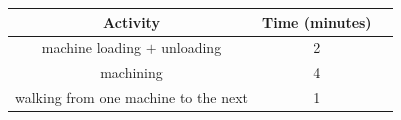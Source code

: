 \begin{center}
\begin{tabular}[12pt]{ |c|c|c| } 
    \hline
    Activity & Time (minutes) \\ 
    \hline
    machine loading $+$ unloading & 2\\
    \hline 
    machining & 4 \\
    \hline
     walking from one machine to the next & 1  \\
    \hline   
\end{tabular}
\end{center}
